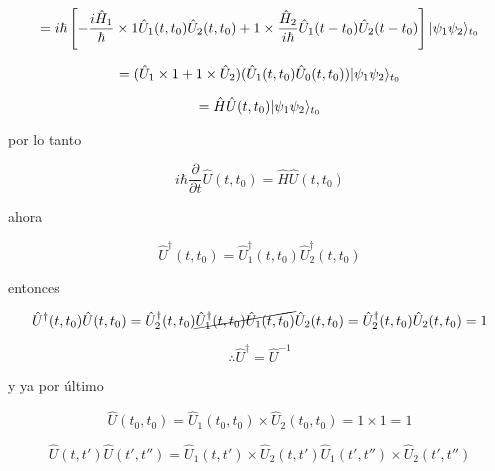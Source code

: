 \documentclass[12pt,a4paper]{article}
\DeclarePairedDelimiter\ket{\lvert}{\rangle}
\begin{document}
\begin{enumerate}
\begin{equation*}
    = i \hbar\left[-\frac{i \hat{H}_1}{\hbar} \times 1 \hat{U}_1 (t,t_0) \hat{U}_2 (t,t_0) + 1 \times \frac{\hat{H}_2}{i \hbar} \hat{U}_1(t-t_0) \hat{U}_2 (t-t_0) \right]  \ket{\psi_1 \psi_2}_{t_0}
\end{equation*}

\begin{equation*}
    = (\hat{U}_1 \times 1 + 1 \times \hat{U}_2) (\hat{U}_1 (t,t_0) \hat{U}_0 (t,t_0)) \ket{\psi_1 \psi_2}_{t_0}
\end{equation*}

\begin{equation*}
    = \hat{H} \hat{U}(t,t_0) \ket{\psi_1 \psi_2}_{t_0}
\end{equation*}

por lo tanto 

\begin{equation*}
    i \hbar \frac{\partial}{\partial t} \hat{U} (t,t_0) = \hat{H} \hat{U} (t,t_0)
\end{equation*}

ahora

\begin{equation*}
    \hat{U}^{\dagger} (t,t_0) = \hat{U}_{1}^{\dagger} (t,t_0) \hat{U}_{2}^{\dagger} (t,t_0)
\end{equation*}

entonces

\begin{equation*}
    \hat{U}^{\dagger}(t,t_0) \hat{U}(t,t_0) = \hat{U}_{2}^{\dagger} (t,t_0) \cancel{\hat{U}_{1}^{\dagger} (t,t_0) \hat{U}_{1}(t,t_0)} \hat{U}_{2} (t,t_0) = \hat{U}_{2}^{\dagger} (t,t_0) \hat{U}_{2} (t,t_0) = 1
\end{equation*}

\begin{equation*}
    \therefore \hat{U}^{\dagger} = \hat{U}^{-1}
\end{equation*}

y ya por último

\begin{equation*}
    \hat{U}(t_0,t_0) = \hat{U}_{1} (t_0,t_0) \times \hat{U}_{2} (t_0,t_0) = 1 \times 1 = 1
\end{equation*}

\begin{equation*}
    \hat{U}(t,t') \hat{U}(t',t'') = \hat{U}_1 (t,t') \times \hat{U}_{2}(t,t') \hat{U}_{1}(t',t'') \times \hat{U}_{2}(t',t'')
\end{equation*}


\end{enumerate}
\end{document}
